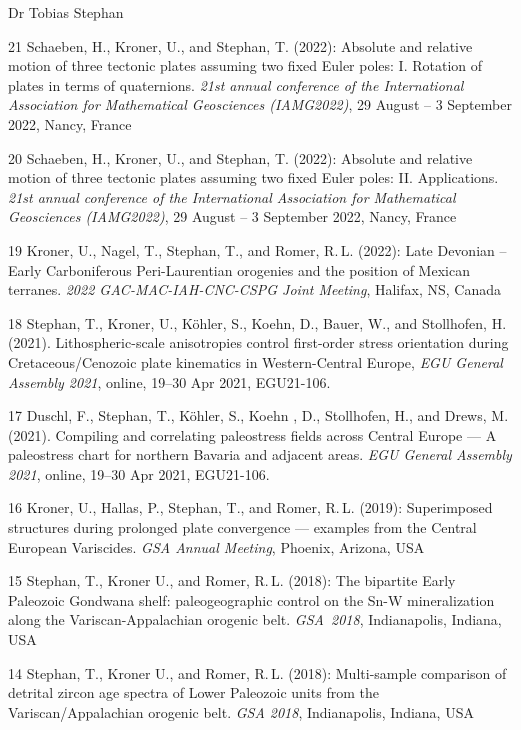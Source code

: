 \documentclass[10pt, paper=letter]{scrartcl} %
\begin{document}
\begin{cv}{\textsf{Dr Tobias Stephan}}
\begin{cvlist}{}
        \item[21] Schaeben, H., Kroner, U., and Stephan, T. (2022): Absolute and relative motion of three tectonic plates assuming two fixed Euler poles: I. Rotation of plates in terms of quaternions. \textit{21st annual conference of the International Association for Mathematical Geosciences (IAMG2022)}, 29 August -- 3 September 2022, Nancy, France
        \item[20] Schaeben, H., Kroner, U., and Stephan, T. (2022): Absolute and relative motion of three tectonic plates assuming two fixed Euler poles: II. Applications. \textit{21st annual conference of the International Association for Mathematical Geosciences (IAMG2022)}, 29 August -- 3 September 2022, Nancy, France
        \item[19] Kroner, U., Nagel, T., Stephan, T., and Romer, R.\,L. (2022): Late Devonian – Early Carboniferous Peri-Laurentian orogenies and the position of Mexican terranes. \textit{2022 GAC-MAC-IAH-CNC-CSPG Joint Meeting}, Halifax, NS, Canada
        \item[18] Stephan, T., Kroner, U., K\"ohler, S., Koehn, D., Bauer, W., and Stollhofen, H. (2021). Lithospheric-scale anisotropies control first-order stress orientation during Cretaceous\-/Cenozoic plate kinematics in Western-Central Europe, \textit{EGU General Assembly 2021}, online, 19--30 Apr 2021, EGU21-106. 
        \item[17] Duschl, F., Stephan, T., K\"ohler, S., Koehn , D., Stollhofen, H., and Drews, M. (2021). Compiling and correlating paleostress fields across Central Europe --- A paleostress chart for northern Bavaria and adjacent areas. \textit{EGU General Assembly 2021}, online, 19--30 Apr 2021, EGU21-106. 
        \item[16] Kroner, U., Hallas, P., Stephan, T., and Romer, R.\,L. (2019): Superimposed structures during prolonged plate convergence --- examples from the Central European Variscides. \textit{GSA Annual Meeting}, Phoenix, Arizona, USA
        \item[15] Stephan, T., Kroner U., and Romer, R.\,L. (2018): The bipartite Early Paleozoic Gondwana shelf: paleogeographic control on the Sn-W mineralization along the Variscan-Appalachian orogenic belt. \mbox{\textit{GSA 2018}}, Indianapolis, Indiana, USA
        \item[14] Stephan, T., Kroner U., and Romer, R.\,L. (2018): Multi-sample comparison of detrital zircon age spectra of Lower Paleozoic units from the Variscan\-/Appalachian orogenic belt. \textit{GSA 2018}, Indianapolis, Indiana, USA

\end{cvlist}
\end{cv}
\end{document}
